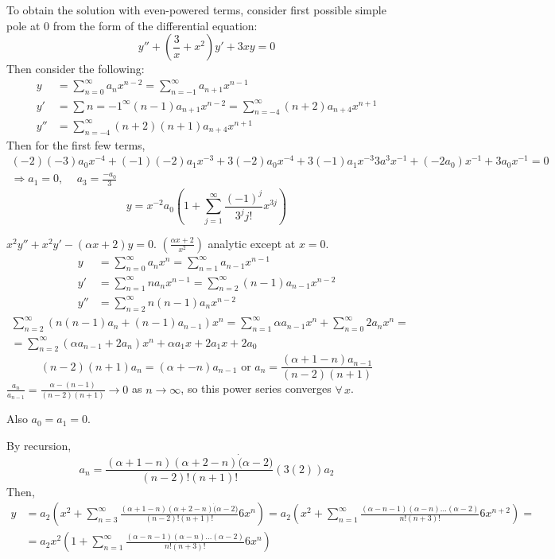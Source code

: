 \documentclass[twoside]{amsart}
\theoremstyle{plain}
\theoremstyle{definition}
\newcommand{\exercisehead}[1]
  {
   \noindent{\small\bf Exercise #1.}
   \smallskip}
\begin{document}

To obtain the solution with even-powered terms, consider first possible simple pole at 0 from the form of the differential equation:
\[
y'' + \left( \frac{3}{x} + x^2 \right)y' + 3xy = 0 
\]
Then consider the following:
\[
\begin{aligned}
  y & = \sum_{n=0}^{\infty} a_n x^{n-2} = \sum_{n=-1}^{\infty} a_{n+1} x^{n-1} \\ 
  y' & = \sum{n=-1}^{\infty} ( n-1) a_{n+1} x^{n-2} = \sum_{n=-4}^{\infty} (n+2) a_{n+4} x^{n+1} \\ 
  y'' & = \sum_{n=-4}^{\infty} (n+2)(n+1) a_{n+4} x^{n+1}
\end{aligned}
\]
Then for the first few terms,
\[
\begin{gathered}
  (-2)(-3) a_0 x^{-4} + (-1)(-2)a_1 x^{-3} + 3(-2) a_0 x^{-4} + 3(-1)a_1 x^{-3} 3a^3 x^{-1} + (-2a_0)x^{-1} + 3a_0 x^{-1} = 0 \\
  \Longrightarrow a_1 = 0, \quad \, a_3 = \frac{- a_0 }{ 3}
\end{gathered}
\]
\[
\boxed{ y = x^{-2} a_0 \left( 1 + \sum_{j=1}^{\infty} \frac{ (-1)^j }{ 3^j j! } x^{3j} \right) }
\]

\exercisehead{6} $x^2 y'' + x^2 y' - ( \alpha x + 2)y =0$.  $\left( \frac{ \alpha x + 2}{x^2} \right)$ analytic except at $x=0$.  
\[
\begin{aligned}
  y & = \sum_{n=0}^{\infty} a_n x^n = \sum_{n=1}^{\infty} a_{n-1} x^{n-1} \\ 
  y' & = \sum_{n=1}^{\infty} n a_n x^{n-1}  = \sum_{n=2}^{\infty} (n-1) a_{n-1} x^{n-2} \\ 
  y'' & = \sum_{n=2}^{\infty} n (n-1) a_n x^{n-2} 
\end{aligned}
\]
\[
\begin{gathered}
  \sum_{n=2}^{\infty} (n(n-1) a_n + (n-1)a_{n-1} )x^n = \sum_{n=1}^{\infty} \alpha a_{n-1} x^n + \sum_{n=0}^{\infty} 2a_n x^n  = \\
  = \sum_{n=2}^{\infty} (\alpha a_{n-1} + 2a_n)x^n + \alpha a_1 x + 2a_1 x + 2a_0 
\end{gathered}
\]
\[
(n-2)(n+1) a_n = (\alpha + -n) a_{n-1} \text{ or } a_n = \frac{ (\alpha + 1 - n) a_{n-1}}{ (n-2)(n+1) }
\]
$\frac{a_n}{a_{n-1}} = \frac{ \alpha - (n-1) }{ (n-2 )(n+1) } \to 0$ as $n \to \infty$, so this power series converges $\forall \, x$.  

Also $a_0 = a_1 =0$.  

By recursion,
\[
a_n = \frac{ (\alpha + 1 - n )(\alpha + 2 - n) \dot ( \alpha -2) }{ (n-2)! (n+1)! } (3(2)) a_2
\]
Then,
\[
\begin{aligned}
  y & = a_2 \left( x^2 + \sum_{n=3}^{\infty} \frac{ ( \alpha + 1 - n)(\alpha + 2 -n) \dot (\alpha -2) }{ (n-2)! (n+1)! } 6 x^n \right)  = a_2 \left( x^2 + \sum_{n=1}^{\infty} \frac{ (\alpha - n - 1) (\alpha -n) \dots (\alpha -2)}{ n! (n+3)! } 6 x^{n+2} \right) = \\
  & = \boxed{ a_2 x^2 \left( 1 + \sum_{n=1}^{\infty} \frac{ (\alpha - n -1) (\alpha -n) \dots ( \alpha -2) }{ n! ( n+3)!}  6 x^n \right) }
\end{aligned}
\]
\end{document}
